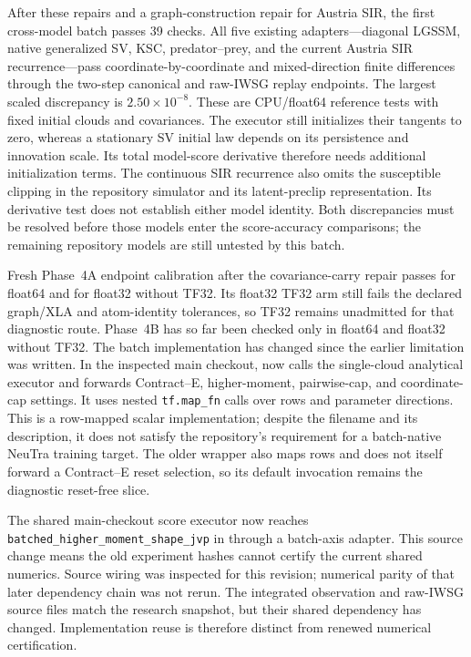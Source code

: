 \documentclass[11pt]{article}
\begin{document}
After these repairs and a graph-construction repair for Austria SIR, the first
cross-model batch passes 39 checks.  All five existing adapters---diagonal
LGSSM, native generalized SV, KSC, predator--prey, and the current Austria SIR
recurrence---pass coordinate-by-coordinate and mixed-direction finite
differences through the two-step canonical and raw-IWSG replay endpoints.
The largest scaled discrepancy is $2.50\times10^{-8}$.  These are CPU/float64
reference tests with fixed initial clouds and covariances.  The executor still
initializes their tangents to zero, whereas a stationary SV initial law depends
on its persistence and innovation scale.  Its total model-score derivative
therefore needs additional initialization terms.  The continuous SIR
recurrence also omits the susceptible clipping in the repository simulator
and its latent-preclip representation.  Its derivative test does not establish
either model identity.  Both discrepancies must be resolved before those
models enter the score-accuracy comparisons; the remaining repository models
are still untested by this batch.

Fresh Phase~4A endpoint calibration after the covariance-carry repair passes
for float64 and for float32 without TF32.  Its float32 TF32 arm still fails the
declared graph/XLA and atom-identity tolerances, so TF32 remains unadmitted for
that diagnostic route.  Phase~4B has so far been checked only in float64 and
float32 without TF32.  The batch implementation has changed since the earlier limitation was
written. In the inspected main checkout,
 now calls the single-cloud analytical
executor and forwards Contract--E, higher-moment, pairwise-cap, and
coordinate-cap settings. It uses nested \texttt{tf.map\_fn} calls over rows
and parameter directions. This is a row-mapped scalar implementation; despite
the filename and its description, it does not satisfy the repository's
requirement for a batch-native NeuTra training target. The older
 wrapper also maps rows and does not itself
forward a Contract--E reset selection, so its default invocation remains the
diagnostic reset-free slice.

The shared main-checkout score executor now reaches
\texttt{batched\_higher\_moment\_shape\_jvp} in
 through a batch-axis adapter. This source
change means the old experiment hashes cannot certify the current shared
numerics. Source wiring was inspected for this revision; numerical parity of
that later dependency chain was not rerun. The integrated observation and
raw-IWSG source files match the research snapshot, but their shared dependency
has changed. Implementation reuse is therefore distinct from renewed
numerical certification.
\end{document}
